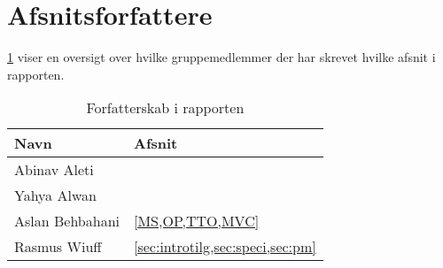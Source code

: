 \appendix
\appendixpage
\addappheadtotoc
\section{Afsnitsforfattere}\label{sec:arbejde}
\cref{tbl:arbejde} viser en oversigt over hvilke gruppemedlemmer der har skrevet hvilke afsnit i rapporten.
\begin{table}[H]
    \centering
    \caption{Forfatterskab i rapporten}\label{tbl:arbejde}
    \begin{tabular}{p{}p{}}
        \toprule
        Navn            & Afsnit                                \\
        \midrule
        Abinav Aleti    &                                       \\
        \midrule
        Yahya Alwan     &                                       \\
        \midrule
        Aslan Behbahani & \cref{MS,OP,TTO,MVC}                  \\
        \midrule
        Rasmus Wiuff    & \cref{sec:introtilg,sec:speci,sec:pm} \\
        \bottomrule
    \end{tabular}
\end{table}